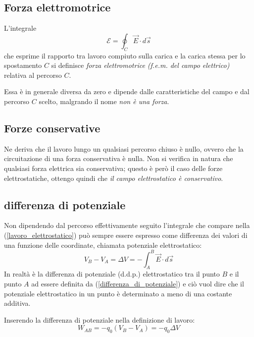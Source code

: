 \documentclass[class=book, crop=false, oneside, 12pt]{standalone}
\begin{document}
\subsection{Forza elettromotrice}

L'integrale 
\begin{equation}
    \mathcal{E} = \oint_C \overrightarrow{E} \cdot d \overrightarrow{s}
\end{equation}
che esprime il rapporto tra lavoro compiuto sulla carica e la carica stessa per lo spostamento \(C\) si definisce \emph{forza elettromotrice (f.e.m. del campo elettrico)} relativa al percorso \(C\).

Essa è in generale diversa da zero e dipende dalle caratteristiche del campo e dal percorso \(C\) scelto, malgrando il nome \emph{non è una forza}.

\subsection{Forze conservative}

Ne deriva che il lavoro lungo un qualsiasi percorso chiuso è nullo, ovvero che la circuitazione di una forza conservativa è nulla.
Non si verifica in natura che qualsiasi forza elettrica sia conservativa; questo è però il caso delle forze elettrostatiche, ottengo quindi che \emph{il campo elettrostatico è conservativo}.

\subsection*{differenza di potenziale}

Non dipendendo dal percorso effettivamente seguito l'integrale che compare nella (\ref{lavoro_elettrostatico}) può sempre essere espresso come differenza dei valori di una funzione delle coordinate, chiamata potenziale elettrostatico: 
\begin{equation} \label{differenza_di_potenziale}
    V_B - V_A = \Delta V = - \int_A^B \overrightarrow{E} \cdot d \overrightarrow{s}
\end{equation}
In realtà è la differenza di potenziale (d.d.p.) elettrostatico tra il punto \(B\) e il punto \(A\) ad essere definita da (\ref{differenza_di_potenziale}) e ciò vuol dire che il potenziale elettrostatico in un punto è determinato a meno di una costante additiva.

Inserendo la differenza di potenziale nella definizione di lavoro:
\begin{equation}
    W_{AB} = -q_0 \left(V_B - V_A\right) = -q_0 \Delta V
\end{equation}
\end{document}
